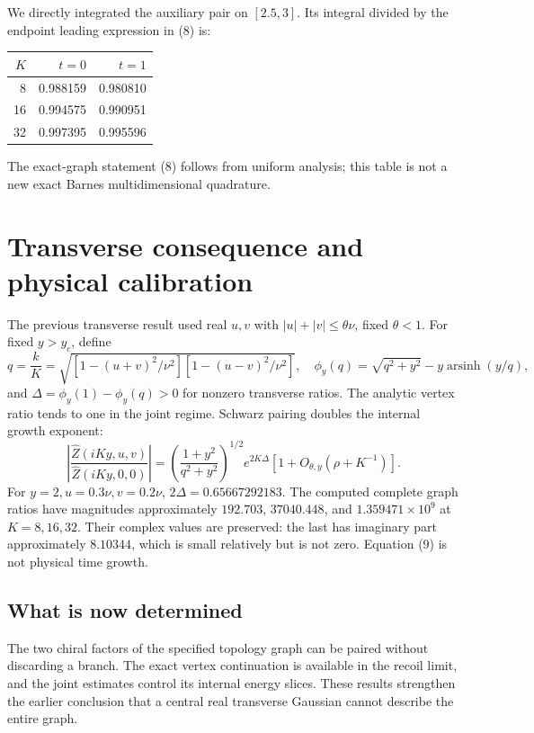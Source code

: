 \documentclass[11pt,a4paper]{article}
\begin{document}
We directly integrated the auxiliary pair on \([2.5,3]\).
Its integral divided by the endpoint leading expression in (8) is:
\begin{center}
\begin{tabular}{rrr}
\toprule
\(K\)&\(t=0\)&\(t=1\)\\
\midrule
8&0.988159&0.980810\\
16&0.994575&0.990951\\
32&0.997395&0.995596\\
\bottomrule
\end{tabular}
\end{center}
The exact-graph statement (8) follows from uniform analysis;
this table is not a new exact Barnes multidimensional quadrature.

\newpage
\section{Transverse consequence and physical calibration}
The previous transverse result used real \(u,v\) with
\(|u|+|v|\le\theta\nu\), fixed \(\theta<1\).
For fixed \(y>y_c\), define
\[
 q=\frac{k}{K}
 =\sqrt{[1-(u+v)^2/\nu^2][1-(u-v)^2/\nu^2]},\quad
 \phi_y(q)=\sqrt{q^2+y^2}-y\operatorname{arsinh}(y/q),
\]
and \(\Delta=\phi_y(1)-\phi_y(q)>0\) for nonzero transverse ratios.
The analytic vertex ratio tends to one in the joint regime.
Schwarz pairing doubles the internal growth exponent:
\[
 \left|\frac{\widehat Z(iKy,u,v)}{\widehat Z(iKy,0,0)}\right|
 =\left(\frac{1+y^2}{q^2+y^2}\right)^{1/2}e^{2K\Delta}
       [1+O_{\theta,y}(\rho+K^{-1})].                             \tag{9}
\]
For \(y=2,u=0.3\nu,v=0.2\nu\), \(2\Delta=0.65667292183\).
The computed complete graph ratios have magnitudes
approximately \(192.703\), \(37040.448\), and \(1.359471\times10^9\)
at \(K=8,16,32\).
Their complex values are preserved: the last has imaginary part
approximately \(8.10344\), which is small relatively but is not zero.
Equation (9) is not physical time growth.

\subsection*{What is now determined}
The two chiral factors of the specified topology graph can be paired
without discarding a branch. The exact vertex continuation is available
in the recoil limit, and the joint estimates control its internal
energy slices. These results strengthen the earlier conclusion that
a central real transverse Gaussian cannot describe the entire graph.
\end{document}
